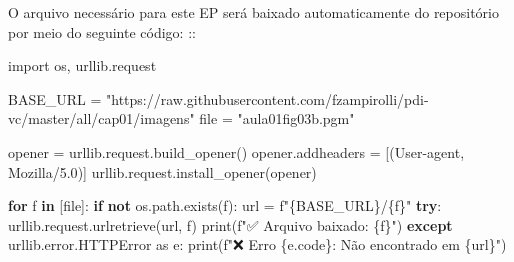 \documentclass[
  portuguese,
  letterpaper,
  openany,
  oneside,
  12pt,
  a4paper]{book}
\newenvironment{Shaded}{\begin{snugshade}}{\end{snugshade}}
\newcommand{\BuiltInTok}[1]{\textcolor[rgb]{0.00,0.23,0.31}{#1}}
\newcommand{\ControlFlowTok}[1]{\textcolor[rgb]{0.00,0.23,0.31}{\textbf{#1}}}
\newcommand{\ImportTok}[1]{\textcolor[rgb]{0.00,0.46,0.62}{#1}}
\newcommand{\KeywordTok}[1]{\textcolor[rgb]{0.00,0.23,0.31}{\textbf{#1}}}
\newcommand{\NormalTok}[1]{\textcolor[rgb]{0.00,0.23,0.31}{#1}}
\newcommand{\OperatorTok}[1]{\textcolor[rgb]{0.37,0.37,0.37}{#1}}
\newcommand{\SpecialCharTok}[1]{\textcolor[rgb]{0.37,0.37,0.37}{#1}}
\newcommand{\SpecialStringTok}[1]{\textcolor[rgb]{0.13,0.47,0.30}{#1}}
\newcommand{\StringTok}[1]{\textcolor[rgb]{0.13,0.47,0.30}{#1}}
\begin{document}
\begin{tcolorbox}[enhanced jigsaw, coltitle=black, colback=white, colbacktitle=quarto-callout-note-color!10!white, bottomtitle=1mm, left=2mm, opacityback=0, breakable, rightrule=.15mm, titlerule=0mm, toptitle=1mm, opacitybacktitle=0.6, title=\textcolor{quarto-callout-note-color}{\faInfo}\hspace{0.5em}{Nota}, colframe=quarto-callout-note-color-frame, arc=.35mm, bottomrule=.15mm, toprule=.15mm, leftrule=.75mm]

O arquivo necessário para este EP será baixado automaticamente do
repositório por meio do seguinte código: ::

\begin{Shaded}
\begin{Highlighting}[]
\ImportTok{import}\NormalTok{ os, urllib.request}

\NormalTok{BASE\_URL }\OperatorTok{=} \StringTok{"https://raw.githubusercontent.com/fzampirolli/pdi{-}vc/master/all/cap01/imagens"}
\BuiltInTok{file} \OperatorTok{=} \StringTok{"aula01fig03b.pgm"}

\NormalTok{opener }\OperatorTok{=}\NormalTok{ urllib.request.build\_opener()}
\NormalTok{opener.addheaders }\OperatorTok{=}\NormalTok{ [(}\StringTok{\textquotesingle{}User{-}agent\textquotesingle{}}\NormalTok{, }\StringTok{\textquotesingle{}Mozilla/5.0\textquotesingle{}}\NormalTok{)]}
\NormalTok{urllib.request.install\_opener(opener)}

\ControlFlowTok{for}\NormalTok{ f }\KeywordTok{in}\NormalTok{ [}\BuiltInTok{file}\NormalTok{]:}
    \ControlFlowTok{if} \KeywordTok{not}\NormalTok{ os.path.exists(f):}
\NormalTok{        url }\OperatorTok{=} \SpecialStringTok{f"}\SpecialCharTok{\{}\NormalTok{BASE\_URL}\SpecialCharTok{\}}\SpecialStringTok{/}\SpecialCharTok{\{}\NormalTok{f}\SpecialCharTok{\}}\SpecialStringTok{"}
        \ControlFlowTok{try}\NormalTok{:}
\NormalTok{            urllib.request.urlretrieve(url, f)}
            \BuiltInTok{print}\NormalTok{(}\SpecialStringTok{f"✅ Arquivo baixado: }\SpecialCharTok{\{}\NormalTok{f}\SpecialCharTok{\}}\SpecialStringTok{"}\NormalTok{)}
        \ControlFlowTok{except}\NormalTok{ urllib.error.HTTPError }\ImportTok{as}\NormalTok{ e:}
            \BuiltInTok{print}\NormalTok{(}\SpecialStringTok{f"❌ Erro }\SpecialCharTok{\{}\NormalTok{e}\SpecialCharTok{.}\NormalTok{code}\SpecialCharTok{\}}\SpecialStringTok{: Não encontrado em }\SpecialCharTok{\{}\NormalTok{url}\SpecialCharTok{\}}\SpecialStringTok{"}\NormalTok{)}
\end{Highlighting}
\end{Shaded}


\end{tcolorbox}
\end{document}
